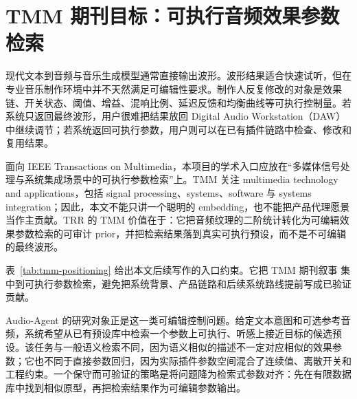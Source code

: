 \chapter{TMM 期刊目标：可执行音频效果参数检索}

现代文本到音频与音乐生成模型通常直接输出波形。波形结果适合快速试听，但在专业音乐制作环境中并不天然满足可编辑性要求。制作人反复修改的对象是效果链、开关状态、阈值、增益、混响比例、延迟反馈和均衡曲线等可执行控制量。若系统只返回最终波形，用户很难把结果放回 Digital Audio Workstation（DAW）中继续调节；若系统返回可执行参数，用户则可以在已有插件链路中检查、修改和复用结果。



面向 IEEE Transactions on Multimedia，本项目的学术入口应放在“多媒体信号处理与系统集成场景中的可执行参数检索”上。TMM 关注 multimedia technology and applications，包括 signal processing、systems、software 与 systems integration；因此，本文不能只讲一个聪明的 embedding，也不能把产品代理愿景当作主贡献。TRR 的 TMM 价值在于：它把音频纹理的二阶统计转化为可编辑效果参数检索的可审计 prior，并把检索结果落到真实可执行预设，而不是不可编辑的最终波形。

\begin{table}[H]
	\centering
	\caption{TMM 期刊定位边界。}
	\label{tab:tmm-positioning}
	\small
\end{table}

表~\ref{tab:tmm-positioning} 给出本文后续写作的入口约束。它把 TMM 期刊叙事 集中到可执行参数检索，避免把系统背景、产品链路和后续系统路线提前写成已验证贡献。

Audio-Agent 的研究对象正是这一类可编辑控制问题。给定文本意图和可选参考音频，系统希望从已有预设库中检索一个参数上可执行、听感上接近目标的候选预设。该任务与一般语义检索不同，因为语义相似的描述不一定对应相似的效果参数；它也不同于直接参数回归，因为实际插件参数空间混合了连续值、离散开关和工程约束。一个保守而可验证的策略是将问题降为检索式参数对齐：先在有限数据库中找到相似原型，再把检索结果作为可编辑参数输出。

